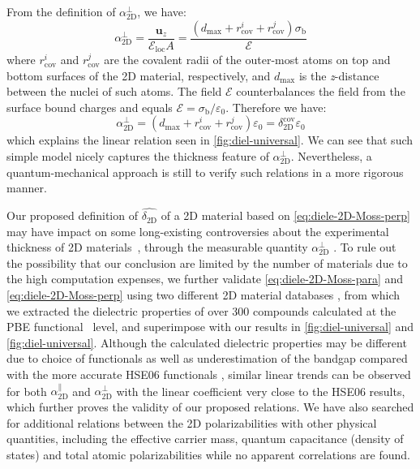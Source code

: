 From the definition of
$\alpha_{\mathrm{2D}}^{\perp}$, we have:
\begin{equation}
  \label{eq:alpha-classic}
  \alpha_{\mathrm{2D}}^{\perp} = \frac{\symbf{u}_{z}}{\mathcal{E}_{\mathrm{loc}} A}
  = \frac{(d_{\mathrm{max}} + r_{\mathrm{cov}}^{i} + r_{\mathrm{cov}}^{j}) \sigma_{\mathrm{b}}}{\mathscr{E}}
\end{equation}
where $r_{\mathrm{cov}}^{i}$ and $r_{\mathrm{cov}}^{j}$ are the
covalent radii of the outer-most atoms on top and bottom surfaces of
the 2D material, respectively, and $d_{\mathrm{max}}$ is the
\textit{z}-distance between the nuclei of such atoms.  The field $\mathcal{E}$
counterbalances the field from the surface bound charges and equals
$\mathcal{E} = \sigma_{\mathrm{b}}/\varepsilon_{0}$. Therefore we have:
\begin{equation}
  \label{eq:alpha-classic-2}
  \alpha_{\mathrm{2D}}^{\perp} = (d_{\mathrm{max}} + r_{\mathrm{cov}}^{i} + r_{\mathrm{cov}}^{j})\varepsilon_{0}
                = \delta_{\mathrm{2D}}^{\mathrm{cov}} \varepsilon_{0}
\end{equation}
which explains the linear relation seen in
\autoref{fig:diel-universal}. We can see that such simple model
nicely captures the thickness feature of
$\alpha_{\mathrm{2D}}^{\perp}$. Nevertheless, a quantum-mechanical
approach is still to verify such relations in a more rigorous manner.


Our proposed definition of
$\hat{\delta_{\mathrm{2D}}}$ of a 2D material based on
\autoref{eq:diele-2D-Moss-perp} may have impact on some long-existing
controversies about the experimental thickness of 2D
materials~\cite{Shearer_2016}, through the measurable quantity
$\alpha_{\mathrm{2D}}^{\perp}$
\cite{Antoine_1999_polariz_C60,Cherniavskaya_2003_nanocryst_polariz,Krauss_1999_EFM}.
% 
%
To rule out the possibility that our conclusion are limited by the
number of materials due to the high computation expenses, we further
validate \autoref{eq:diele-2D-Moss-para} and
\autoref{eq:diele-2D-Moss-perp} using two different 2D material
databases \cite{Haastrup_2018_database,Mounet_2018_database}, from
which we extracted the dielectric properties of over 300 compounds
calculated at the PBE functional~\cite{Perdew_1996_GGA} level, and
superimpose with our results in \autoref{fig:diel-universal} and
\autoref{fig:diel-universal}. Although the calculated dielectric
properties may be different due to choice of functionals as well as
underestimation of the bandgap compared with the more accurate HSE06
functionals \cite{Van_Dyck_2017}, similar linear trends can be
observed for both $\alpha^{\parallel}_{\mathrm{2D}}$ and
$\alpha_{\mathrm{2D}}^{\perp}$ with the linear coefficient very close
to the HSE06 results, which further proves the validity of our
proposed relations. We have also searched for additional relations
between the 2D polarizabilities with other physical quantities,
including the effective carrier mass, quantum capacitance (density of
states) and total atomic polarizabilities while no apparent
correlations are found.

